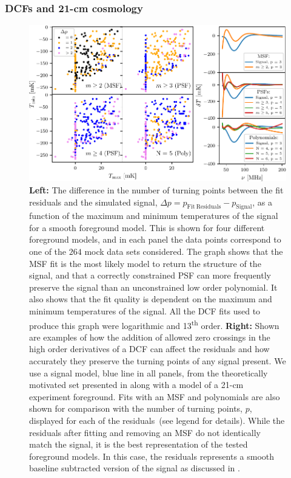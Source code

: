 \subsubsection{DCFs and 21-cm cosmology}

\begin{figure}
    \centering
    \includegraphics{maxsmooth/figs/Figure8.pdf}
    \caption{\textbf{Left:} The difference in the number of turning points between the fit residuals and the simulated signal, $\Delta p = p_\mathrm{Fit~Residuals} - p_\mathrm{Signal}$, as a function of the maximum and minimum temperatures of the signal for a smooth foreground model. This is shown for four different foreground models, and in each panel the data points correspond to one of the $264$ mock data sets considered. The graph shows that the MSF fit is the most likely model to return the structure of the signal, and that a correctly constrained PSF can more frequently preserve the signal than an unconstrained low order polynomial. It also shows that the fit quality is dependent on the maximum and minimum temperatures of the signal. All the DCF fits used to produce this graph were logarithmic and 13\textsuperscript{th} order. \textbf{Right:} Shown are examples of how the addition of allowed zero crossings in the high order derivatives of a DCF can affect the residuals and how accurately they preserve the turning points of any signal present. We use a signal model, blue line in all panels, from the theoretically motivated set presented in \protect\cite{Cohen_global_2017} along with a model of a 21-cm experiment foreground. Fits with an MSF and polynomials are also shown for comparison with the number of turning points, $p$, displayed for each of the residuals~(see legend for details). While the residuals after fitting and removing an MSF do not identically match the signal, it is the best representation of the tested foreground models. In this case, the residuals represents a smooth baseline subtracted version of the signal as discussed in \citep{Sathyanarayana_msf_2017}.}
    \label{fig:PSF_comp}
\end{figure}

